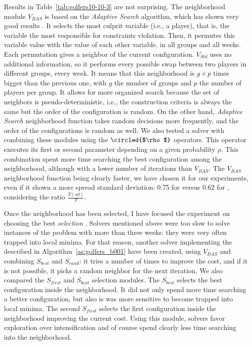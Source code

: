 Results in Table~\ref{tab:golfers10-10-3} are not surprising. The neighborhood module $V_{BAS}$ is based on the {\it Adaptive Search} algorithm, which has shown very good results \cite{Diaz}. %
It selects the most culprit variable (i.e., a player), that is, the variable the most responsible for constraints violation. Then, it permutes this variable value with the value of each other variable, in all groups and all weeks. Each permutation gives a neighbor of the current configuration. $V_{Std}$ uses no additional information, so it performs every possible swap between two players in different groups, every week. It means that this neighborhood is $g\times p$ times bigger than the previous one, with $g$ the number of groups and $p$ the number of players per group. 
It allows for more organized search because the set of neighbors is pseudo-deterministic, i.e., the construction criteria is always the same but the order of the configuration is random. On the other hand, {\it Adaptive Search} neighborhood function takes random decisions more frequently, and the order of the configurations is random as well. We also tested a solver with combining these modules using the $\circled{$\rho$}$ operators. This operator executes its first or second parameter depending on a given probability $\rho$. This combination spent more time searching the best configuration among the neighborhood, although with a lower number of iterations than $V_{BAS}$. The $V_{BAS}$ neighborhood function being clearly faster, we have chosen it for our experiments, even if it shown a more spread standard deviation: 0.75 for  versus 0.62 for , considering the ratio $\tfrac{T(sd)}{T}$.

\separation

Once the neighborhood \om{} has been selected, I have focused the experiment on choosing the best {\it selection} \om. Solvers mentioned above were too slow to solve instances of the problem with more than three weeks: they were very often trapped into local minima. For that reason, another solver implementing the \as{} described in Algorithm~\ref{as:golfers_b001} have been created, using $V_{BAS}$ and combining $S_{best}$ and $S_{rand}$: it tries a number of times to improve the cost, and if it is not possible, it picks a random neighbor for the next iteration. We also compared the $S_{first}$ and $S_{best}$ selection modules. The \om{} $S_{best}$ selects the best configuration inside the neighborhood. It did not only spend more time searching a better configuration, but also is was more sensitive to become trapped into local minima. The second \om{} $S_{first}$ selects the first configuration inside the neighborhood improving the current cost. Using this module, solvers favor exploration over intensification and of course spend clearly less time searching into the neighborhood. 

